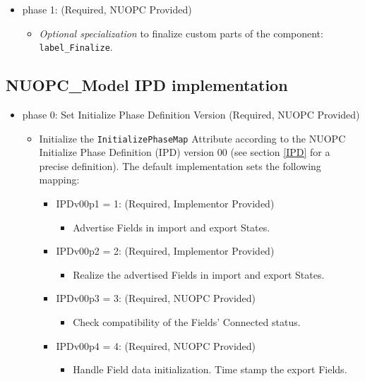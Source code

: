 \begin{itemize}
\item phase 1: ({\sc Required, NUOPC Provided})
  \begin{itemize}
  \item {\it Optional specialization} to finalize custom parts of the component: {\tt label\_Finalize}.
  \end{itemize}      
\end{itemize}

\subsection{NUOPC\_Model IPD implementation}
\begin{itemize}
\item phase 0: Set Initialize Phase Definition Version ({\sc Required, NUOPC Provided})
  \begin{itemize}
  \item Initialize the {\tt InitializePhaseMap} Attribute according to the NUOPC Initialize Phase Definition (IPD) version 00 (see section \ref{IPD} for a precise definition). The default implementation sets the following mapping:
    \begin{itemize}
    \item IPDv00p1 = 1: ({\sc Required, Implementor Provided})
      \begin{itemize}
      \item Advertise Fields in import and export States.
      \end{itemize}
    \item IPDv00p2 = 2: ({\sc Required, Implementor Provided})
      \begin{itemize}
      \item Realize the advertised Fields in import and export States.
      \end{itemize}  
    \item IPDv00p3 = 3: ({\sc Required, NUOPC Provided})
      \begin{itemize}
      \item Check compatibility of the Fields' Connected status.
      \end{itemize}
    \item IPDv00p4 = 4: ({\sc Required, NUOPC Provided})
      \begin{itemize}
      \item Handle Field data initialization. Time stamp the export Fields.
      \end{itemize}

\end{itemize}
\end{itemize}
\end{itemize}
